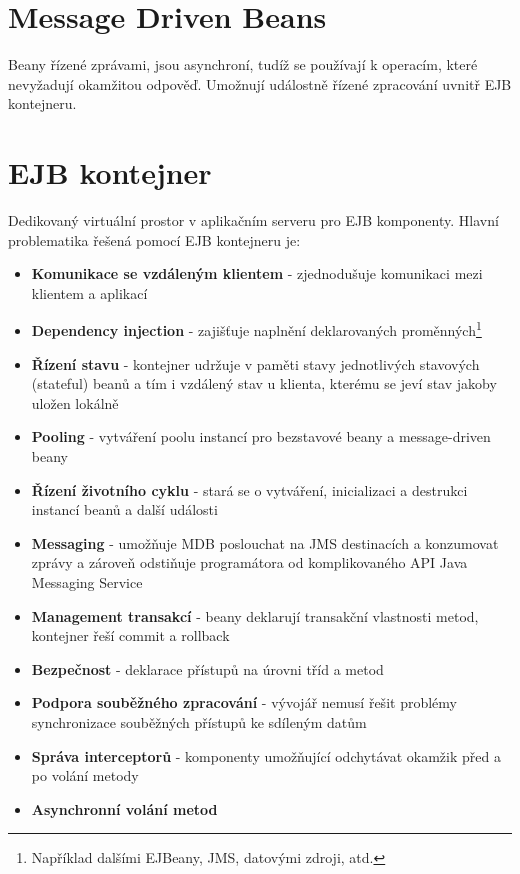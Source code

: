 \documentclass{article}
\begin{document}
\section*{Message Driven Beans}

Beany řízené zprávami, jsou asynchroní, tudíž se používají k operacím, které nevyžadují okamžitou odpověď. Umožnují událostně řízené zpracování uvnitř EJB kontejneru.

\section*{EJB kontejner}

Dedikovaný virtuální prostor v aplikačním serveru pro EJB komponenty. Hlavní problematika řešená pomocí EJB kontejneru je:

\begin{itemize}
\item \textbf{Komunikace se vzdáleným klientem} - zjednodušuje komunikaci mezi klientem a aplikací
\item \textbf{Dependency injection} - zajišťuje naplnění deklarovaných proměnných\footnote{Například dalšími EJBeany, JMS, datovými zdroji, atd.}
\item \textbf{Řízení stavu} - kontejner udržuje v paměti stavy jednotlivých stavových (stateful) beanů a tím i vzdálený stav u klienta, kterému se jeví stav jakoby uložen lokálně
\item \textbf{Pooling} - vytváření poolu instancí pro bezstavové beany a message-driven beany
\item \textbf{Řízení životního cyklu} - stará se o vytváření, inicializaci a destrukci instancí beanů a další události
\item \textbf{Messaging} - umožňuje MDB poslouchat na JMS destinacích a konzumovat zprávy a zároveň odstiňuje programátora od komplikovaného API Java Messaging Service
\item \textbf{Management transakcí} - beany deklarují transakční vlastnosti metod, kontejner řeší commit a rollback
\item \textbf{Bezpečnost} - deklarace přístupů na úrovni tříd a metod
\item \textbf{Podpora souběžného zpracování} - vývojář nemusí řešit problémy synchronizace souběžných přístupů ke sdíleným datům
\item \textbf{Správa interceptorů} - komponenty umožňující odchytávat okamžik před a po volání metody
\item \textbf{Asynchronní volání metod}
\end{itemize}
\end{document}
